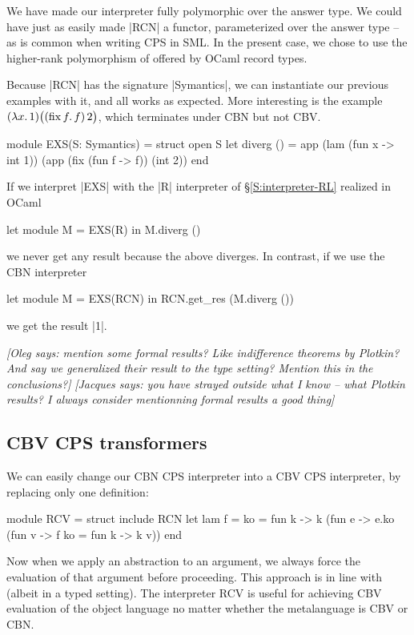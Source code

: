 \documentclass[preprint]{sigplanconf}
\newcommand{\jacques}[1]{{\it [Jacques says: #1]}}
\newcommand{\oleg}[1]{{\it [Oleg says: #1]}}
\newcommand{\fun}[1]{\mathopen{\lambda\mathord{#1}.\,}}
\newcommand{\fix}[1]{\mathopen{\mathrm{fix\,}\mathord{#1}.\,}}
\begin{document}
We have made our interpreter fully polymorphic over the answer type.
We could have just as easily made |RCN| a functor, parameterized over
the answer type -- as is common when writing CPS in SML. In the
present case, we chose to use the higher-rank polymorphism of offered by
OCaml record types.

Because |RCN| has the signature |Symantics|, we can instantiate our previous
examples with it, and all works as expected.  More interesting
is the example $(\fun{x}1)\bigl((\fix{f}f)\mathinner2\bigr)$, which terminates
under CBN but not CBV\@.
\begin{code}
module EXS(S: Symantics) = struct
 open S
 let diverg () = 
   app (lam (fun x -> int 1)) 
       (app (fix (fun f -> f)) (int 2))
end
\end{code}

If we interpret |EXS| with the |R| interpreter of
\S\ref{S:interpreter-RL} realized in OCaml
\begin{code}
let module M = EXS(R) in M.diverg ()
\end{code}
we never get any result because the above diverges. In contrast, if we use
the CBN interpreter
\begin{code}
let module M = EXS(RCN) in RCN.get_res (M.diverg ())
\end{code}
we get the result |1|.

\oleg{mention some formal results? Like indifference theorems by
  Plotkin? And say we generalized their result to the type setting?
  Mention this in the conclusions?}
\jacques{you have strayed outside what I know -- what Plotkin results?
  I always consider mentionning formal results a good thing}

\subsection{CBV CPS transformers}

We can easily change our CBN CPS interpreter into a CBV CPS
interpreter, by replacing only one definition:
\begin{code}
module RCV = struct
  include RCN
  let lam f = {ko = 
    fun k -> k (fun e -> e.ko 
         (fun v -> f {ko = fun k -> k v}))}
end
\end{code}
Now when we apply an abstraction to an argument, we always force
the evaluation of that argument before proceeding. This approach is in
line with \citet{reynolds-relation} (albeit in a typed setting). The interpreter RCV
is useful for achieving CBV evaluation of the object language
no matter whether the metalanguage is CBV or CBN.
\end{document}

